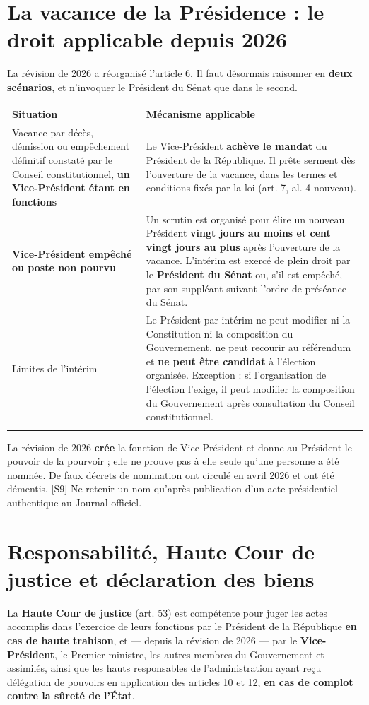 \documentclass[11pt,a4paper,oneside]{report}
\newcommand{\src}[1]{\textcolor{bluec}{\scriptsize[#1]}}
\begin{document}
\section{La vacance de la Présidence : le droit applicable depuis 2026}
La révision de 2026 a réorganisé l'article 6. Il faut désormais raisonner en \textbf{deux scénarios}, et n'invoquer le Président du Sénat que dans le second.

\begin{longtable}{>{\raggedright\arraybackslash}p{} >{\raggedright\arraybackslash}p{}}
\toprule
\textbf{\color{navy}Situation} & \textbf{\color{navy}Mécanisme applicable} \\
\midrule\endhead
Vacance par décès, démission ou empêchement définitif constaté par le Conseil constitutionnel, \textbf{un Vice-Président étant en fonctions} & Le Vice-Président \textbf{achève le mandat} du Président de la République. Il prête serment dès l'ouverture de la vacance, dans les termes et conditions fixés par la loi (art. 7, al. 4 nouveau). \\
\addlinespace[1pt]
\textbf{Vice-Président empêché ou poste non pourvu} & Un scrutin est organisé pour élire un nouveau Président \textbf{vingt jours au moins et cent vingt jours au plus} après l'ouverture de la vacance. L'intérim est exercé de plein droit par le \textbf{Président du Sénat} ou, s'il est empêché, par son suppléant suivant l'ordre de préséance du Sénat. \\
\addlinespace[1pt]
Limites de l'intérim & Le Président par intérim ne peut modifier ni la Constitution ni la composition du Gouvernement, ne peut recourir au référendum et \textbf{ne peut être candidat} à l'élection organisée. Exception : si l'organisation de l'élection l'exige, il peut modifier la composition du Gouvernement après consultation du Conseil constitutionnel. \\
\addlinespace[1pt]
\bottomrule
\end{longtable}
\begin{warnbox}[title={Point de vigilance — Ne jamais inventer de titulaire}]
La révision de 2026 \textbf{crée} la fonction de Vice-Président et donne au Président le pouvoir de la pourvoir ; elle ne prouve pas à elle seule qu'une personne a été nommée. De faux décrets de nomination ont circulé en avril 2026 et ont été démentis. \src{S9} Ne retenir un nom qu'après publication d'un acte présidentiel authentique au Journal officiel.
\end{warnbox}
\section{Responsabilité, Haute Cour de justice et déclaration des biens}
La \textbf{Haute Cour de justice} (art. 53) est compétente pour juger les actes accomplis dans l'exercice de leurs fonctions par le Président de la République \textbf{en cas de haute trahison}, et — depuis la révision de 2026 — par le \textbf{Vice-Président}, le Premier ministre, les autres membres du Gouvernement et assimilés, ainsi que les hauts responsables de l'administration ayant reçu délégation de pouvoirs en application des articles 10 et 12, \textbf{en cas de complot contre la sûreté de l'État}.
\end{document}
